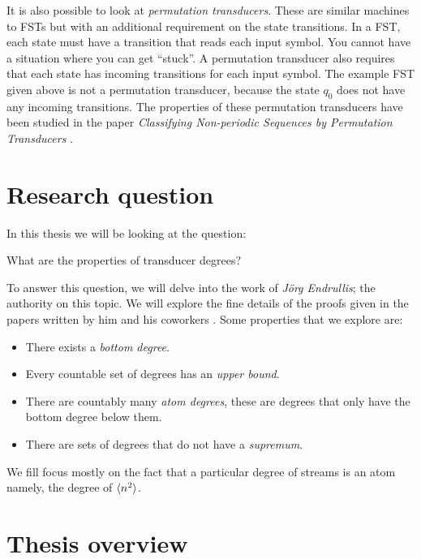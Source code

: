It is also possible to look at \textit{permutation transducers}. These are similar machines to FSTs but with an additional requirement on the state transitions. In a FST, each state must have a transition that reads each input symbol. You cannot have a situation where you can get ``stuck''. A permutation transducer also requires that each state has incoming transitions for each input symbol. The example FST given above is not a permutation transducer, because the state $q_0$ does not have any incoming transitions. The properties of these permutation transducers have been studied in the paper \textit{Classifying Non-periodic Sequences by Permutation Transducers} \cite{10.1007/978-3-319-62809-7_28}.

\newpage
\section*{Research question}

In this thesis we will be looking at the question:
\begin{center}
	What are the properties of transducer degrees?
\end{center}
To answer this question, we will delve into the work of \textit{Jörg Endrullis}; the authority on this topic. We will explore the fine details of the proofs given in the papers written by him and his coworkers \cite{streams:degrees:2011,streams:degrees:suprema:2020,streams:degrees:squares:2015}. Some properties that we explore are:
\begin{itemize}
	\item There exists a \textit{bottom degree}.
	\item Every countable set of degrees has an \textit{upper bound}.
	\item There are countably many \textit{atom degrees}, these are degrees that only have the bottom degree below them.
	\item There are sets of degrees that do not have a \textit{supremum}.
\end{itemize}
We fill focus mostly on the fact that a particular degree of streams is an atom namely, the degree of $\langle n^2 \rangle$. 

\section*{Thesis overview}

